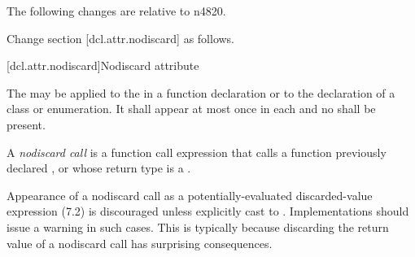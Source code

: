 \documentclass[ebook,11pt,article]{memoir}
\begin{document}
The following changes are relative to n4820. 

Change section [dcl.attr.nodiscard] as follows. 

[dcl.attr.nodiscard]{Nodiscard attribute}%

\pnum
The  
may be applied to the 
in a function declaration or to the declaration of a class or enumeration.
It shall appear at most once in each  and
no  shall be present.

\pnum
\begin{note}
A \emph{nodiscard call} is a function call expression 
that
calls a function 
previously declared , or
whose return type is a 
. 
 
Appearance of a nodiscard call as
a potentially-evaluated discarded-value expression (7.2)%
is discouraged unless explicitly cast to .
Implementations should issue a warning in such cases.
This is typically because discarding the return value
of a nodiscard call has surprising consequences.
\end{note}
\end{document}
